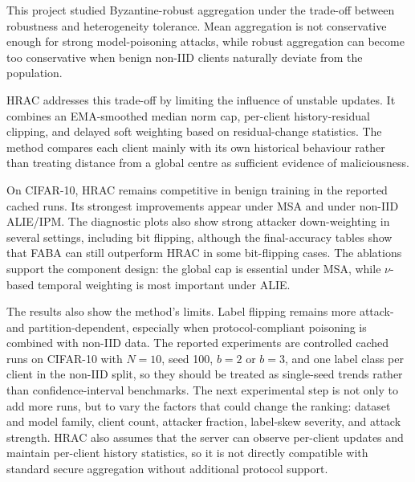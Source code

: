 \label{Conclusions}

This project studied Byzantine-robust aggregation under the trade-off between
robustness and heterogeneity tolerance. Mean aggregation is not conservative
enough for strong model-poisoning attacks, while robust aggregation can become
too conservative when benign non-IID clients naturally deviate from the
population.

HRAC addresses this trade-off by limiting the influence of unstable updates. It
combines an EMA-smoothed median norm cap, per-client history-residual clipping,
and delayed soft weighting based on residual-change statistics. The method
compares each client mainly with its own historical behaviour rather than
treating distance from a global centre as sufficient evidence of maliciousness.

On CIFAR-10, HRAC remains competitive in benign training in the reported cached
runs. Its strongest improvements appear under MSA and under non-IID ALIE/IPM. The
diagnostic plots also show strong attacker down-weighting in several settings,
including bit flipping, although the final-accuracy tables show that FABA can
still outperform HRAC in some bit-flipping cases. The ablations support the
component design: the global cap is essential under MSA, while $\nu$-based
temporal weighting is most important under ALIE.

The results also show the method's limits. Label flipping remains more
attack- and partition-dependent, especially when protocol-compliant poisoning is
combined with non-IID data. The reported experiments are controlled cached runs
on CIFAR-10 with \(N=10\), seed 100, \(b=2\) or \(b=3\), and one label class per
client in the non-IID split, so they should be treated as single-seed trends
rather than confidence-interval benchmarks. The next experimental step is not
only to add more runs, but to vary the factors that could change the ranking:
dataset and model family, client count, attacker fraction, label-skew severity,
and attack strength. HRAC also assumes that the server can observe per-client
updates and maintain per-client history statistics, so it is not directly
compatible with standard secure aggregation without additional protocol support.
